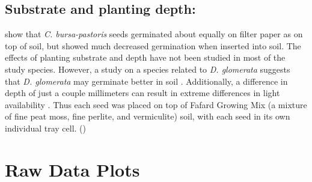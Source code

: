 \documentclass[12pt]{article}\usepackage[]{graphicx}\usepackage[]{color}
\begin{document}
\subsection{Substrate and planting depth:} \textcite{Popay1970} show that \textit{C. bursa-pastoris} seeds germinated about equally on filter paper as on top of soil, but showed much decreased germination when inserted into soil. The effects of planting substrate and depth have not been studied in most of the study species. However, a study on a species related to \textit{D. glomerata} suggests that \textit{D. glomerata} may germinate better in soil \parencite{Andrews1974}. Additionally, a difference in depth of just a couple millimeters can result in extreme differences in light availability \parencite{Tester1987}. Thus each seed was placed on top of Fafard Growing Mix (a mixture of fine peat moss, fine perlite, and vermiculite) soil, with each seed in its own individual tray cell.
\printbibliography()
\section{Raw Data Plots}
\end{document}
